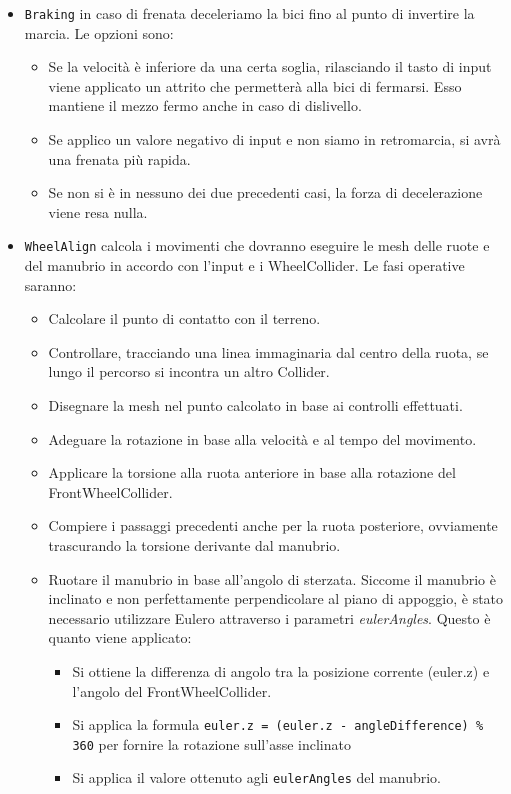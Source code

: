 \begin{itemize}
		\item \texttt{Braking} in caso di frenata deceleriamo la bici fino al punto di invertire la marcia. Le opzioni sono:
		\begin{itemize}
			\item Se la velocità è inferiore da una certa soglia, rilasciando il tasto di input viene applicato un attrito che permetterà alla bici di fermarsi. Esso mantiene il mezzo fermo anche in caso di dislivello.
			\item Se applico un valore negativo di input e non siamo in retromarcia, si avrà una frenata più rapida.
			\item Se non si è in nessuno dei due precedenti casi, la forza di decelerazione viene resa nulla.
		\end{itemize}
		
		\item \texttt{WheelAlign} calcola i movimenti che dovranno eseguire le mesh delle ruote e del manubrio in accordo con l’input e i WheelCollider. Le fasi operative saranno:
		\begin{itemize}
			\item Calcolare il punto di contatto con il terreno.
			\item Controllare, tracciando una linea immaginaria dal centro della ruota, se lungo il percorso si incontra un altro Collider.
			\item Disegnare la mesh nel punto calcolato in base ai controlli effettuati.
			\item Adeguare la rotazione in base alla velocità e al tempo del movimento.
			\item Applicare la torsione alla ruota anteriore in base alla rotazione del FrontWheelCollider.
			\item Compiere i passaggi precedenti anche per la ruota posteriore, ovviamente trascurando la torsione derivante dal manubrio.
			\item Ruotare il manubrio in base all’angolo di sterzata. Siccome il manubrio è inclinato e non perfettamente perpendicolare al piano di appoggio, è stato necessario utilizzare Eulero attraverso i parametri \textit{eulerAngles}. Questo è quanto viene applicato:
			\begin{itemize}
			  \item Si ottiene la differenza di angolo tra la posizione corrente (euler.z) e l'angolo del FrontWheelCollider.
			  \item Si applica la formula \texttt{euler.z = \-(euler.z \-- \-angleDifference) \% 360} per fornire la rotazione sull'asse inclinato
			  \item Si applica il valore ottenuto agli \texttt{eulerAngles} del manubrio.
			\end{itemize}


\end{itemize}
\end{itemize}
